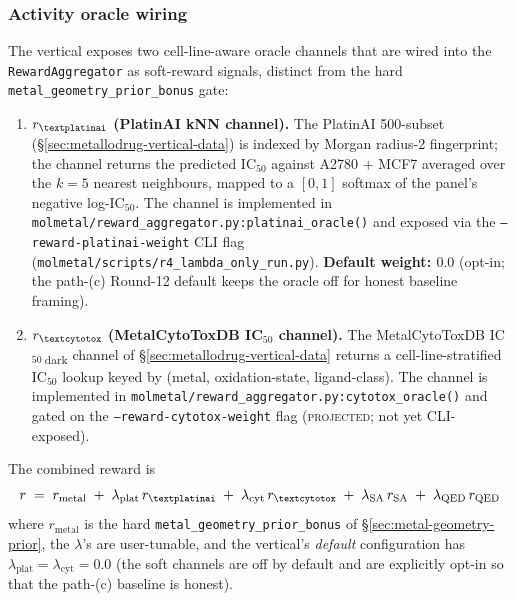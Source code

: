 \subsubsection{Activity oracle wiring}
\label{sec:metallodrug-vertical-oracle}

The vertical exposes two cell-line-aware oracle channels that
are wired into the \texttt{RewardAggregator} as
soft-reward signals, distinct from the hard
\texttt{metal\_geometry\_prior\_bonus} gate:
\begin{enumerate}
  \item \textbf{$r_\textplatinai$ (PlatinAI kNN channel).}
        The PlatinAI 500-subset
        (\S\ref{sec:metallodrug-vertical-data}) is indexed
        by Morgan radius-2 fingerprint; the channel returns
        the predicted IC$_{50}$ against A2780 + MCF7
        averaged over the $k{=}5$ nearest neighbours,
        mapped to a $[0,1]$ softmax of the panel's negative
        log-IC$_{50}$. The channel is implemented in
        \texttt{molmetal/reward\_aggregator.py:platinai\_oracle()}
        and exposed via the
        \texttt{--reward-platinai-weight} CLI flag
        (\texttt{molmetal/scripts/r4\_lambda\_only\_run.py}).
        \textbf{Default weight: $0.0$} (opt-in; the path-(c)
        Round-12 default keeps the oracle off for honest
        baseline framing).

  \item \textbf{$r_\textcytotox$ (MetalCytoToxDB IC$_{50}$
        channel).}
        The MetalCytoToxDB
        IC$_{50}$\,\textsubscript{dark} channel of
        \S\ref{sec:metallodrug-vertical-data} returns a
        cell-line-stratified IC$_{50}$ lookup keyed by
        (metal, oxidation-state, ligand-class). The channel
        is implemented in
        \texttt{molmetal/reward\_aggregator.py:cytotox\_oracle()}
        and gated on the
        \texttt{--reward-cytotox-weight} flag
        (\textsc{projected}; not yet CLI-exposed).
\end{enumerate}
The combined reward is
\begin{equation}
  \label{eq:metallodrug-reward}
  r \;=\; r_\text{metal} \;+\;
       \lambda_\text{plat}\, r_\textplatinai \;+\;
       \lambda_\text{cyt}\, r_\textcytotox \;+\;
       \lambda_\text{SA}\, r_\text{SA} \;+\;
       \lambda_\text{QED}\, r_\text{QED}
\end{equation}
where $r_\text{metal}$ is the hard
\texttt{metal\_geometry\_prior\_bonus} of
\S\ref{sec:metal-geometry-prior}, the $\lambda$'s are
user-tunable, and the vertical's \emph{default}
configuration has $\lambda_\text{plat} = \lambda_\text{cyt}
= 0.0$ (the soft channels are off by default and are
explicitly opt-in so that the path-(c) baseline is honest).

